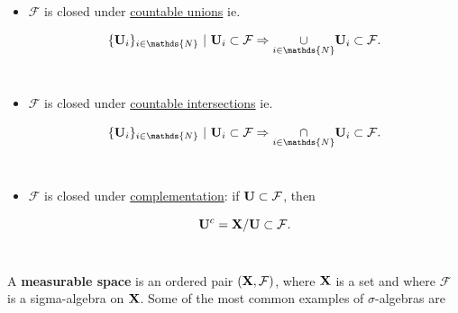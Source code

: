 \documentclass{homework}
\begin{document}
\begin{itemize}
    \item $\mathcal{F}$ is closed under \underline{countable unions} ie.
    
    $$
    \{{\bf U}_i\}_{i \in \mathds{N}} \textnormal{ } | \textnormal{ } {\bf U}_i \subset \mathcal{F} \Rightarrow \underset{i \in \mathds{N}}{\cup} {\bf U}_i \subset \mathcal{F}.
    $$\\
    
    \item $\mathcal{F}$ is closed under \underline{countable intersections} ie.
    
    $$
    \{{\bf U}_i\}_{i\in \mathds{N}} \textnormal{ } | \textnormal{ } {\bf U}_i \subset \mathcal{F} \Rightarrow \underset{i\in \mathds{N}}{\cap} {\bf U}_i \subset \mathcal{F}. 
    $$\\
    
    \item $\mathcal{F}$ is closed under \underline{complementation}: if ${\bf U} \subset \mathcal{F}$, then 
    
    $$
    {\bf U}^c = {\bf X} / {\bf U} \subset \mathcal{F}.
    $$\\
\end{itemize}

A \textbf{measurable space} is an ordered pair $({\bf X}, \mathcal{F})$, where ${\bf X}$ is a set and where $\mathcal{F}$ is a sigma-algebra on ${\bf X}$. Some of the most common examples of $\sigma$-algebras are
\end{document}
